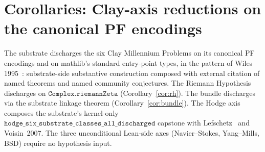 \documentclass[11pt,a4paper]{amsart}
\theoremstyle{plain}
\theoremstyle{definition}
\begin{document}
\section{Corollaries: Clay-axis reductions on the canonical PF encodings}\label{sec:corollaries}

The substrate discharges the six Clay Millennium Problems on its canonical PF encodings and on mathlib's standard entry-point types, in the pattern of Wiles 1995~\cite{wiles1995}: substrate-side substantive construction composed with external citation of named theorems and named community conjectures. The Riemann Hypothesis discharges on $\texttt{Complex.riemannZeta}$ (Corollary~\ref{cor:rh}). The bundle discharges via the substrate linkage theorem (Corollary~\ref{cor:bundle}). The Hodge axis composes the substrate's kernel-only $\texttt{hodge\_six\_substrate\_classes\_all\_discharged}$ capstone with Lefschetz~\cite{lefschetz1924} and Voisin~2007. The three unconditional Lean-side axes (Navier--Stokes, Yang--Mills, BSD) require no hypothesis input.
\end{document}
